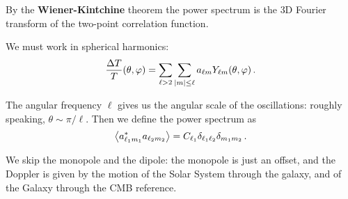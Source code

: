 \documentclass[main.tex]{subfiles}
\begin{document}
By the \textbf{Wiener-Kintchine} theorem the power spectrum is the 3D Fourier transform of the two-point correlation function. 

We must work in spherical harmonics: 
%
\begin{align}
\frac{\Delta T}{T} (\theta , \varphi ) = \sum _{\ell>2} \sum _{\abs{m} \leq \ell} a_{\ell m} Y_{\ell m} (\theta ,\varphi )
\,.
\end{align}

The angular frequency \(\ell\) gives  us the angular scale of the oscillations: roughly speaking, \(\theta \sim \pi / \ell\). 
Then we define the power spectrum as 
%
\begin{align}
\expval{a^{*}_{\ell_1 m_1 } a_{\ell_2 m_2 }} = C_{\ell_1} \delta_{\ell_1 \ell_2 } \delta_{m_1 m_2 }
\,.
\end{align}

We skip the monopole and the dipole: the monopole is just an offset, and the Doppler is given by the motion of the Solar System through the galaxy, and of the Galaxy through the CMB reference. 
\end{document}
